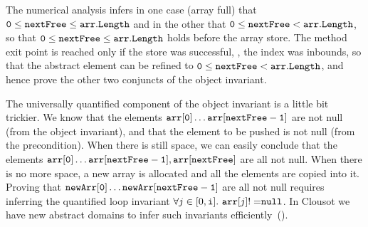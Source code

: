 \documentclass{llncs}
\begin{document}
The numerical analysis infers in one case (array full) that $\mathtt{0} \leq \mathtt{nextFree} \leq \mathtt{arr.Length}$ and in the other that $\mathtt{0} \leq \mathtt{nextFree} < \mathtt{arr.Length}$, so that $\mathtt{0} \leq \mathtt{nextFree} \leq \mathtt{arr.Length}$ holds before the array store.
The method exit point is reached only if the store was successful, \ie, the index was inbounds, so that the abstract element can be refined to  $\mathtt{0} \leq \mathtt{nextFree} < \mathtt{arr.Length}$, and hence prove the other two conjuncts of the object invariant.

The universally quantified component of the object invariant is a little bit trickier.
We know that the elements $\mathtt{arr[0]} \dots \mathtt{arr[nextFree-1]}$ are not null (from the object invariant), and that the element to be pushed is not null (from the precondition).
When there is still space, we can easily conclude that the elements  $\mathtt{arr[0]} \dots \mathtt{arr[nextFree-1], \mathtt{arr[nextFree]}}$ are all not null.
When there is no more space, a new array is allocated and all the elements are copied into it.
Proving that $\mathtt{newArr[0]} \dots \mathtt{newArr[nextFree-1]}$ are all not null requires inferring the quantified loop invariant $\forall j \in [0, \mathtt{i}].\ \mathtt{arr}[j] \mathtt{!=} \mathtt{null}$. 
In Clousot we have new abstract domains to infer such invariants efficiently~().
\end{document}
